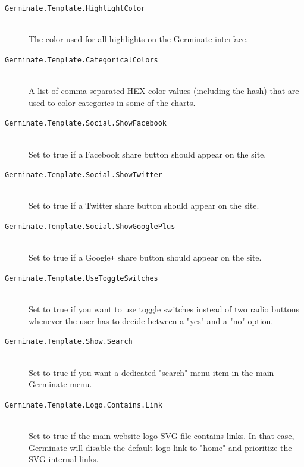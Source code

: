 \begin{description}
    \item[\texttt{Germinate.Template.HighlightColor}] \\The color used for all highlights on the Germinate interface.
    \item[\texttt{Germinate.Template.CategoricalColors}\nonoptional] \\A list of comma separated HEX color values (including the hash) that are used to color categories in some of the charts.
    \item[\texttt{Germinate.Template.Social.ShowFacebook}] \\Set to true if a Facebook share button should appear on the site.
    \item[\texttt{Germinate.Template.Social.ShowTwitter}] \\Set to true if a Twitter share button should appear on the site.
    \item[\texttt{Germinate.Template.Social.ShowGooglePlus}] \\Set to true if a Google\texttt{+} share button should appear on the site.
    \item[\texttt{Germinate.Template.UseToggleSwitches}] \\Set to true if you want to use toggle switches instead of two radio buttons whenever the user has to decide between a "yes" and a "no" option.
    \item[\texttt{Germinate.Template.Show.Search}] \\Set to true if you want a dedicated "search" menu item in the main Germinate menu.
    \item[\texttt{Germinate.Template.Logo.Contains.Link}] \\Set to true if the main website logo SVG file contains links. In that case, Germinate will disable the default logo link to "home" and prioritize the SVG-internal links.

\end{description}
